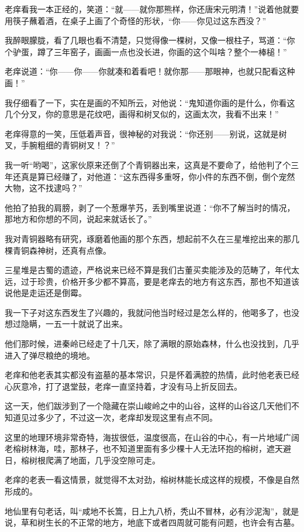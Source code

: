 老痒看我一本正经的，笑道：“就——就你那熊样，你还唐宋元明清！”说着他就要用筷子蘸着酒，在桌子上画了个奇怪的形状，“你——你见过这东西没？”

我醉眼朦胧，看了几眼也看不清楚，只觉得像一棵树，又像一根柱子，骂道：“你个驴蛋，蹲了三年窑子，画画一点也没长进，你画的这个叫啥？整个一棒槌！”

老痒说道：“你——你——你就凑和着看吧！就你那——那眼神，也就只配看这种画！”

我仔细看了一下，实在是画的不知所云，对他说：“鬼知道你画的是什么，你看这几个分叉，你的意思是花纹吧，画得和树叉似的，这画太次，我看不出来！”

老痒得意的一笑，压低着声音，很神秘的对我说：“你还别——别说，这就是树叉，手腕粗细的青铜树叉！？”

我一听“哟喝”，这家伙原来还倒了个青铜器出来，这真是不要命了，给他判了个三年还真是算已经赚了，对他道：“这东西得多重呀，你小件的东西不倒，倒个宠然大物，这不找逮吗？”

他拍了拍我的肩膀，剥了一个葱爆芋艿，丢到嘴里说道：“你不了解当时的情况，那地方和你想的不同，说起来就话长了。”

我对青铜器略有研究，琢磨着他画的那个东西，想起前不久在三星堆挖出来的那几棵青铜森神树，还真有点像。

三星堆是古蜀的遗迹，严格说来已经不算是我们古董买卖能涉及的范畴了，年代太远，过于珍贵，价格开多少都不算高，要是老痒去的地方有这东西，那也不知道该说他是走运还是倒霉。

我一下子对这东西发生了兴趣的，我就问他当时经过是怎么样的，他喝多了，也没想过隐瞒，一五一十就说了出来。

他们那时候，进秦岭已经走了十几天，除了满眼的原始森林，什么也没找到，几乎进入了弹尽粮绝的境地。

老痒和他老表其实都没有盗墓的基本常识，只是怀着满腔的热情，此时他老表已经心灰意冷，打了退堂鼓，老痒一直坚持着，才没有马上折反回去。

这一天，他们跋涉到了一个隐藏在崇山峻岭之中的山谷，这样的山谷这几天他们不知道见过多少了，不过这一次，老痒却发现这里有点不同。

这里的地理环境非常奇特，海拔很低，温度很高，在山谷的中心，有一片地域广阔老榕树林海，哇，那林子，也不知道里面有多少棵十人无法环抱的榕树，遮天避日，榕树根爬满了地面，几乎没空隙可走。

老痒的老表一看这情景，就觉得不太对劲，榕树林能长成这样的规模，不像是自然形成的。

地仙里有句老话，叫“咸地不长篙，日上九八桥，秃山不冒林，必有沙泥淘”，就是说，草和树生长的不正常的地方，地底下或者四周就可能有问题，也许会有古墓。

